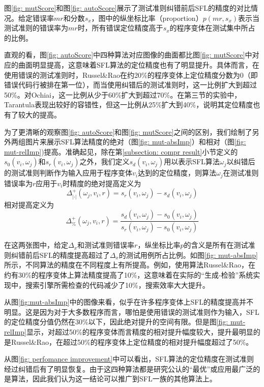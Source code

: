 图\ref{fig: mutScore}和图\ref{fig: autoScore}展示了测试准则纠错前后SFL的精度的对比情况。给定错误率$mr$和分数$s_x$，图中的纵坐标比率（proportion）$p(mr, s_x)$表示当测试准则的错误率为$mr$时，所有错误定位精度高于$s_x$的程序变体在测试集中所占的比例。

直观的看，图\ref{fig: autoScore}中四种算法对应图像的曲面都比图\ref{fig: mutScore}中对应的曲面明显提高，这意味着SFL算法的定位精度也有了明显提升。具体而言，在使用错误的测试准则时，Russel\&Rao在约20\%的程序变体上定位精度分数为$0$（即错误代码行被排在第一位），而当使用纠错后的测试准则时，这一比例扩大到超过50\%。对Ochiai，这一比例从少于60\%扩大到超过70\%。在第三节的实验中，Tarantula表现出较好的容错性，但这一比例从25\%扩大到40\%，说明其定位精度也有了较大的提高。

为了更清晰的观察图\ref{fig: autoScore}和图\ref{fig: mutScore}之间的区别，我们绘制了另外两组图片来展示SFL算法精度的绝对（图\ref{fig: mut-absImp}）和相对（图\ref{fig: mut-relImp})提高。准确起见，除在第\ref{subsection: compr result}小节定义的$s_0(v_i, \omega_j)$和$s_r(v_i, \omega_j)$之外，我们定义$s_d(v_i, \omega_j)$用以表示SFL算法$\omega_j$以纠错后的测试准则判断作为输入应用于程序变体$v_i$达到的定位精度，则算法$\omega_j$在测试准则错误率为$r$应用于$v_i$时精度的绝对提高定义为
$$
\Delta_{|\cdot|}^{+}(\omega_j, v_i, r) = s_r(v_i, \omega_j) - s_d(v_i, \omega_j)
$$
相对提高定义为
$$
\Delta_{\%}^{+}(\omega_j, v_i, r) = \frac{s_d(v_i, \omega_j) - s_0(v_i, \omega_j)}{s_r(v_i, \omega_j) - s_0(v_i, \omega_j)}
$$

在这两张图中，给定$\Delta_x$和测试准则错误率$r$，纵坐标比率$p$的含义是所有在测试准则纠错前后SFL的精度提高超过了$\Delta_x$的测试用例所占比例。如图\ref{fig: mut-absImp}所示，不同算法的精度在不同程度上有所提高。例如，使用算法Russel\&Rao，在约有30\%的程序变体上算法精度提高了10\%，这意味着在实际的“生成-检验”系统实现中，搜索引擎所需检查的代码减少了10\%，搜索效率大大提升。

从图\ref{fig:mut-absImp}中的图像来看，似乎在许多程序变体上SFL的精度提高并不明显。这是因为对于大多数程序而言，哪怕是使用错误的测试准则作为输入，SFL的定位精度分值仍然在30\%以下，因此绝对提升的空间有限。但是图\ref{fig: mut-relImp}显示，对超过50\%的程序变体而言精度的相对提升幅度较大，提升最明显的是Russel\&Rao，在超过50\%的程序变体上定位精度的相对提升幅度超过了50\%。

从图\ref{fig: perfomance improvement}中可以看出，SFL算法的定位精度在测试准则经过纠错后有了明显恢复。由于这四种算法都是研究公认的“最优”或应用最广泛的是算法，因此我们认为这一结论可以推广到SFL一族的其他算法上。


